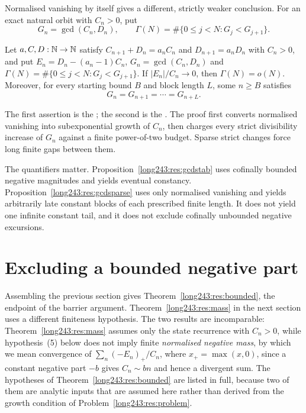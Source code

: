 \documentclass[11pt]{article}
\begin{document}
Normalised vanishing by itself gives a different, strictly weaker conclusion.
For an exact natural orbit with $C_n>0$, put
\[
 G_n=\gcd(C_n,D_n),\qquad
 \Gamma(N)=\#\{0\le j<N:G_j<G_{j+1}\}.
\]

\begin{proposition}
\label{long243:res:gcdsparse}
Let $a,C,D:\mathbb{N}\to\mathbb{N}$ satisfy $C_{n+1}+D_n=a_nC_n$ and $D_{n+1}=a_nD_n$ with
$C_n>0$, and put $E_n=D_n-(a_n-1)C_n$, $G_n=\gcd(C_n,D_n)$ and
$\Gamma(N)=\#\{0\le j<N:G_j<G_{j+1}\}$.  If $|E_n|/C_n\to0$, then
$\Gamma(N)=o(N)$.  Moreover, for every starting bound $B$ and block length
$L$, some $n\ge B$ satisfies
\[
  G_n=G_{n+1}=\cdots=G_{n+L}.
\]
\end{proposition}

\noindent The first assertion is the
; the second is the
.  The proof first converts normalised vanishing
into subexponential growth of $C_n$, then charges every strict divisibility
increase of $G_n$ against a finite power-of-two budget.  Sparse strict changes
force long finite gaps between them.

The quantifiers matter.  Proposition~\ref{long243:res:gcdstab} uses cofinally bounded
negative magnitudes and yields eventual constancy.  Proposition~\ref{long243:res:gcdsparse}
uses only normalised vanishing and yields arbitrarily late constant blocks of
each prescribed finite length.  It does not yield one infinite constant tail,
and it does not exclude cofinally unbounded negative excursions.

\section{Excluding a bounded negative part}\label{long243:sec:bounded}

Assembling the previous section gives Theorem~\ref{long243:res:bounded}, the endpoint
of the barrier argument.  Theorem~\ref{long243:res:mass} in the next section uses a
different finiteness hypothesis.  The two results are incomparable:
Theorem~\ref{long243:res:mass} assumes only the state recurrence with $C_n>0$, while
hypothesis~(5) below does not imply
finite \emph{normalised negative mass}, by which we mean convergence of
$\sum_n(-E_n)_+/C_n$, where $x_+=\max(x,0)$, since a constant negative part
$-b$ gives $C_n\sim bn$ and hence a divergent sum.  The hypotheses of
Theorem~\ref{long243:res:bounded} are listed
in full, because two of them are analytic inputs
that are assumed here rather than derived from the growth condition of
Problem~\ref{long243:res:problem}.
\end{document}
